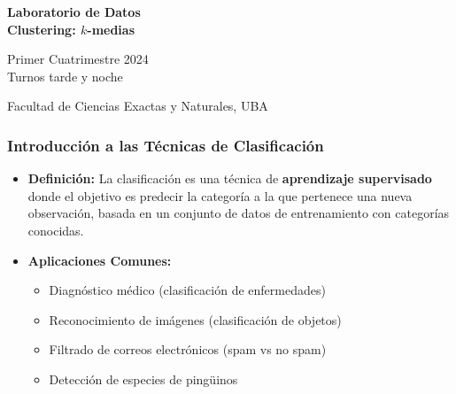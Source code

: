 \documentclass[aspectratio=169,12pt]{beamer}
\begin{document}

\begin{frame}

 \begin{center}

\Large\textbf{Laboratorio de Datos} \\
\large\textbf{Clustering: $k$-medias}



\vspace{1cm}
Primer Cuatrimestre 2024 \\ Turnos tarde y noche

\vspace{1cm}


 {\small Facultad de Ciencias Exactas y Naturales, UBA}
 \end{center}


\end{frame}



\begin{frame}
\frametitle{Introducción a las Técnicas de Clasificación}
\begin{itemize}
    \item \textbf{Definición:} La clasificación es una técnica de \textbf{aprendizaje supervisado} donde el objetivo es predecir la categoría a la que pertenece una nueva observación, basada en un conjunto de datos de entrenamiento con categorías conocidas.
    \item \textbf{Aplicaciones Comunes:}
    \begin{itemize}
        \item Diagnóstico médico (clasificación de enfermedades)
        \item Reconocimiento de imágenes (clasificación de objetos)
        \item Filtrado de correos electrónicos (spam vs no spam)
        \item Detección de especies de ping\"uinos
    \end{itemize}
\end{itemize}
\end{frame}
\end{document}
